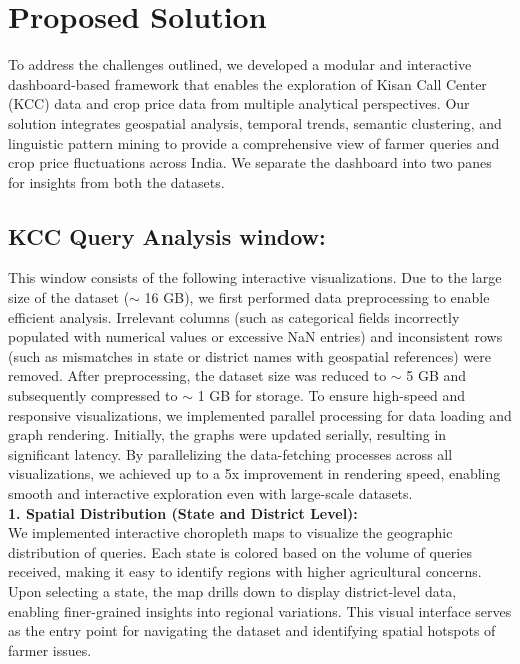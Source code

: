 \documentclass[a4paper, 12pt]{article}
\begin{document}
\noinden\section{Proposed Solution}

To address the challenges outlined, we developed a modular and interactive dashboard-based framework that enables the exploration of Kisan Call Center (KCC) data and crop price data from multiple analytical perspectives. Our solution integrates geospatial analysis, temporal trends, semantic clustering, and linguistic pattern mining to provide a comprehensive view of farmer queries and crop price fluctuations across India. We separate the dashboard into two panes for insights from both the datasets.

\subsection{KCC Query Analysis window:}

This window consists of the following interactive visualizations. Due to the large size of the dataset ($\sim$ 16 GB), we first performed data preprocessing to enable efficient analysis. Irrelevant columns (such as categorical fields incorrectly populated with numerical values or excessive NaN entries) and inconsistent rows (such as mismatches in state or district names with geospatial references) were removed. After preprocessing, the dataset size was reduced to $\sim$ 5 GB and subsequently compressed to $\sim$ 1 GB for storage. 
To ensure high-speed and responsive visualizations, we implemented parallel processing for data loading and graph rendering. Initially, the graphs were updated serially, resulting in significant latency. By parallelizing the data-fetching processes across all visualizations, we achieved up to a 5x improvement in rendering speed, enabling smooth and interactive exploration even with large-scale datasets. \\

\textbf{1. Spatial Distribution (State and District Level):} \\
We implemented interactive choropleth maps to visualize the geographic distribution of queries. Each state is colored based on the volume of queries received, making it easy to identify regions with higher agricultural concerns. Upon selecting a state, the map drills down to display district-level data, enabling finer-grained insights into regional variations. This visual interface serves as the entry point for navigating the dataset and identifying spatial hotspots of farmer issues.
\end{document}
